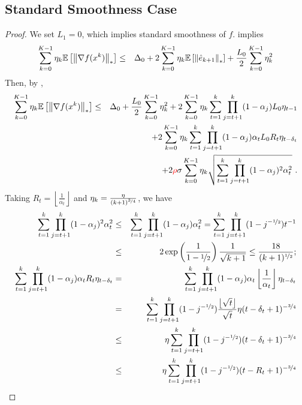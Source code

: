 \documentclass{article}
\begin{document}
\subsection{Standard Smoothness Case}
% 
\begin{proof}
We set $L_1 = 0$, which implies standard smoothness of $f$.
 implies 
\begin{eqnarray*}
    \sum_{k=0}^{K-1} \eta_k {\mathbb{E}}\left[\left\| \nabla f(x^k) \right\|_*\right] &\le& \Delta_0 + 2\sum^{K-1}_{k=0}\eta_k{\mathbb{E}}\left[\left\| \hat{e}_{k+1} \right\|_*\right] +\frac{L_0}{2}\sum^{K-1}_{k=0}\eta_k^2
\end{eqnarray*}
% 
Then, by , 
\begin{eqnarray*}
    \sum_{k=0}^{K-1} \eta_k {\mathbb{E}}\left[\left\| \nabla f(x^k) \right\|_*\right] &\le& \Delta_0  +\frac{L_0}{2}\sum^{K-1}_{k=0}\eta_k^2 + 2\sum^{K-1}_{k=0}\eta_k\sum_{t=1}^k \prod_{j=t+1}^{k}(1-\alpha_j) L_0\eta_{t-1}\\
    && + 2\sum^{K-1}_{k=0}\eta_k\sum_{t=1}^k \prod_{j=t+1}^{k}(1-\alpha_j) \alpha_t L_0 R_t\eta_{t-\delta_t}\\
    && + 2{\color{red} \rho} \sigma\sum^{K-1}_{k=0}\eta_k\sqrt{\sum_{t=1}^k \prod_{j=t+1}^{k}(1-\alpha_j)^2 \alpha_t^2} ~.
\end{eqnarray*}
% 
Taking $R_t = \left\lfloor\frac{1}{\alpha_t}\right\rfloor$ and $\eta_k = \frac{\eta}{(k+1)^{\nicefrac{3}{4}}}$, we have 
\begin{eqnarray*}
    \sum_{t=1}^k \prod_{j=t+1}^{k}(1-\alpha_j)^2 \alpha_t^2 &\le& \sum_{t=1}^k \prod_{j=t+1}^{k}(1-\alpha_j) \alpha_t^2 =  \sum_{t=1}^k \prod_{j=t+1}^{k}(1-j^{-\nicefrac{1}{2}}) t^{-1}\\
        &\le& 2\exp\left(\frac{1}{1-\nicefrac{1}{2}}\right) \frac{1}{\sqrt{k+1}} \le \frac{18}{(k+1)^{\nicefrac{1}{2}}};\\
    \sum_{t=1}^k \prod_{j=t+1}^{k}(1-\alpha_j) \alpha_t R_t\eta_{t-\delta_t}
        &=& \sum_{t=1}^k \prod_{j=t+1}^{k}(1-\alpha_j) \alpha_t \left\lfloor\frac{1}{\alpha_t}\right\rfloor\eta_{t-\delta_t}\\
        &=& \sum_{t=1}^k \prod_{j=t+1}^{k}(1-j^{-\nicefrac{1}{2}}) \frac{\left\lfloor\sqrt{t}\right\rfloor}{\sqrt{t}} \eta (t-\delta_t+1)^{-\nicefrac{3}{4}}\\
        &\le& \eta \sum_{t=1}^k \prod_{j=t+1}^{k}(1-j^{-\nicefrac{1}{2}}) (t-\delta_t+1)^{-\nicefrac{3}{4}}\\
        &\le& \eta \sum_{t=1}^k \prod_{j=t+1}^{k}(1-j^{-\nicefrac{1}{2}}) (t-R_t+1)^{-\nicefrac{3}{4}}\\

\end{eqnarray*}
\end{proof}
\end{document}

